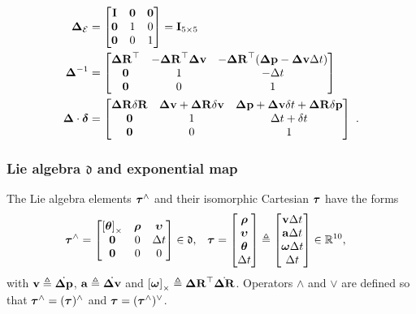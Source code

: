 \begin{align}
{{\bm \Delta}}_{\mathcal{E}}&=\begin{bmatrix}
{\bf I} & \bf0 & \bf0 \\
\bf0 & 1 & 0 \\
\bf0 & 0 & 1 
\end{bmatrix} = {\bf I}_{5\times5}
\label{equ:identity}
\\
{{\bm \Delta}}^{-1} &= \begin{bmatrix}
{\bm \Delta {\bf R}}^{\top} & -{\bm \Delta {\bf R}}^{\top}{\bm \Delta {\bf v}} & -{\bm \Delta {\bf R}}^{\top}({\bm \Delta {\bf p}}-{\bm \Delta {\bf v}}\Delta t) \\
\bf0 & 1 & -\Delta t \\
\bf0 & 0 & 1
\end{bmatrix} 
\label{equ:inverse}
\\
{{\bm \Delta}}\cdot\bm\delta 
&= 
\begin{bmatrix}
{\bm \Delta {\bf R}}{\delta{\bf R}} & {\bm \Delta {\bf v}} + {\bm \Delta {\bf R}}{\delta{\bf v}} & {\bm \Delta {\bf p}}+{\bm \Delta {\bf v}}\delta t + {\bm \Delta {\bf R}}{\delta{\bf p}} \\
\bf0 & 1 & \Delta t+\delta t \\
\bf0 & 0 & 1
\end{bmatrix}
~.
\label{equ:composition}
\end{align}
%



\subsubsection{Lie algebra \texorpdfstring{$\mathfrak{d}$}{d} and exponential map}

The Lie algebra elements ${\bm \tau}^\wedge$ and their isomorphic Cartesian ${\bm \tau}$ have the forms
%
\begin{align}\label{equ:lie_algebra}
    {\bm \tau}^\wedge &= \begin{bmatrix}
    \left[{{\bm \theta}}\right]_\times & {\bm \rho} & {\bm \upsilon} \\
    \bf0 & 0 & \Delta t \\
    \bf0 & 0 & 0
    \end{bmatrix} \in \mathfrak{d}
    ,&
    {\bm \tau} &= \begin{bmatrix}
    {\bm \rho} \\ {\bm \upsilon} \\ {{\bm \theta}} \\ \Delta t
    \end{bmatrix}
    \triangleq \begin{bmatrix}
    {\bf v}\Delta t \\ {\bf a}\Delta t \\ {{\bm \omega}}\Delta t \\ \Delta t
    \end{bmatrix} 
    \in {\mathbb R}^{10}
    ,
\end{align}
%
with ${\bf v}\triangleq\dot{{\bm \Delta {\bf p}}}$, ${\bf a}\triangleq\dot{{\bm \Delta {\bf v}}}$ and $\left[{{\bm \omega}}\right]_\times\triangleq{\bm \Delta {\bf R}}^{\top}\dot{{\bm \Delta {\bf R}}}$.
Operators $\wedge$ and $\vee$ are defined so that ${\bm \tau}^\wedge=({\bm \tau})^\wedge$ and ${\bm \tau}=({\bm \tau}^\wedge)^\vee$.

